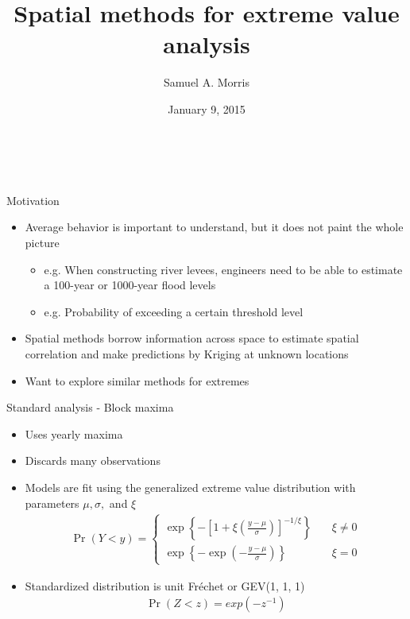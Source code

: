 \documentclass{beamer}
\title[Spatial methods for extreme value analysis] %
{
  Spatial methods for extreme value analysis
}
\author[Samuel A. Morris]{Samuel A. Morris}
\institute[NCSU]{}
\date{January 9, 2015}
\begin{document}
\begin{frame}\frametitle{\ }
\begin{center}
  \maketitle
\end{center}
\end{frame}

\begin{frame}{Motivation}
  \begin{itemize} \setlength{\itemsep}{1em}
    \item Average behavior is important to understand, but it does not paint the whole picture
    \begin{itemize}
      \item e.g. When constructing river levees, engineers need to be able to estimate a 100-year or 1000-year flood levels
      \item e.g. Probability of exceeding a certain threshold level
    \end{itemize}
    \item Spatial methods borrow information across space to estimate spatial correlation and make predictions by Kriging at unknown locations
    \item Want to explore similar methods for extremes
  \end{itemize}
\end{frame}

\begin{frame}{Standard analysis - Block maxima}
  \begin{itemize} \setlength{\itemsep}{0.5em}
    \item Uses yearly maxima
    \item Discards many observations
    \item Models are fit using the generalized extreme value distribution with parameters $\mu, \sigma,$ and $\xi$
    \begin{align*}
      \Pr(Y < y) = \left\{  \begin{array}{ll}
        \exp\left\{ -\left[ 1 + \xi \left( \frac{ y - \mu }{ \sigma } \right) \right]^{ -1 / \xi} \right\} & \quad \xi \neq 0 \\
        \exp \left\{ -\exp \left( - \frac{ y - \mu }{ \sigma} \right) \right\} & \quad \xi = 0
      \end{array}\right.
    \end{align*}
    \item Standardized distribution is unit Fr\'{e}chet or GEV(1, 1, 1)
    \begin{align*}
      \Pr(Z < z) = exp(-z^{-1})
    \end{align*}
  \end{itemize}
\end{frame}
\end{document}
